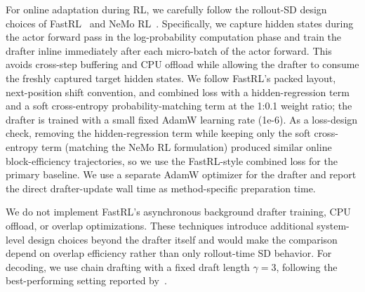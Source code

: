 \documentclass{llmxive}
\begin{document}
For online adaptation during RL, we carefully follow the rollout-SD design choices of FastRL~\citep{hu2026taming} and NeMo RL~\citep{iso2026accelerating}.
Specifically, we capture hidden states during the actor forward pass in the log-probability computation phase and train the drafter inline immediately after each micro-batch of the actor forward.
This avoids cross-step buffering and CPU offload while allowing the drafter to consume the freshly captured target hidden states.
We follow FastRL's packed layout, next-position shift convention, and combined loss with a hidden-regression term and a soft cross-entropy probability-matching term at the 1:0.1 weight ratio; the drafter is trained with a small fixed AdamW learning rate (1e-6).
As a loss-design check, removing the hidden-regression term while keeping only the soft cross-entropy term (matching the NeMo RL formulation) produced similar online block-efficiency trajectories, so we use the FastRL-style combined loss for the primary baseline.
We use a separate AdamW optimizer for the drafter and report the direct drafter-update wall time as method-specific preparation time.

We do not implement FastRL's asynchronous background drafter training, CPU offload, or overlap optimizations.
These techniques introduce additional system-level design choices beyond the drafter itself and would make the comparison depend on overlap efficiency rather than only rollout-time SD behavior.
For decoding, we use chain drafting with a fixed draft length $\gamma=3$, following the best-performing setting reported by~\citet{iso2026accelerating}.
\end{document}
